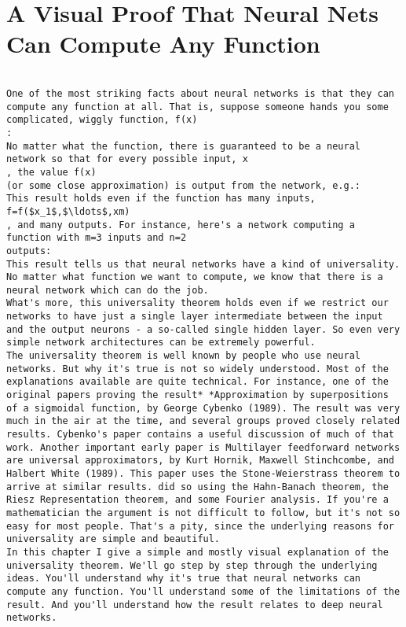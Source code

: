 
\chapter{A Visual Proof That Neural Nets Can Compute Any Function}
\label{sec:AVisualProofThatNeuralNetsCanComputeAnyFunction}


\begin{lstlisting}

One of the most striking facts about neural networks is that they can compute any function at all. That is, suppose someone hands you some complicated, wiggly function, f(x)
:
No matter what the function, there is guaranteed to be a neural network so that for every possible input, x
, the value f(x)
(or some close approximation) is output from the network, e.g.:
This result holds even if the function has many inputs, f=f($x_1$,$\ldots$,xm)
, and many outputs. For instance, here's a network computing a function with m=3 inputs and n=2
outputs:
This result tells us that neural networks have a kind of universality. No matter what function we want to compute, we know that there is a neural network which can do the job.
What's more, this universality theorem holds even if we restrict our networks to have just a single layer intermediate between the input and the output neurons - a so-called single hidden layer. So even very simple network architectures can be extremely powerful.
The universality theorem is well known by people who use neural networks. But why it's true is not so widely understood. Most of the explanations available are quite technical. For instance, one of the original papers proving the result* *Approximation by superpositions of a sigmoidal function, by George Cybenko (1989). The result was very much in the air at the time, and several groups proved closely related results. Cybenko's paper contains a useful discussion of much of that work. Another important early paper is Multilayer feedforward networks are universal approximators, by Kurt Hornik, Maxwell Stinchcombe, and Halbert White (1989). This paper uses the Stone-Weierstrass theorem to arrive at similar results. did so using the Hahn-Banach theorem, the Riesz Representation theorem, and some Fourier analysis. If you're a mathematician the argument is not difficult to follow, but it's not so easy for most people. That's a pity, since the underlying reasons for universality are simple and beautiful.
In this chapter I give a simple and mostly visual explanation of the universality theorem. We'll go step by step through the underlying ideas. You'll understand why it's true that neural networks can compute any function. You'll understand some of the limitations of the result. And you'll understand how the result relates to deep neural networks.

\end{lstlisting}
